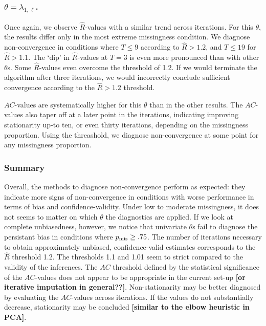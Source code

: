 \documentclass[Royal,times,sageh]{sagej}
\begin{document}
\hypertarget{thetalambda_1-ell.}{%
\subsubsection{\texorpdfstring{\(\theta=\lambda_{1, \ell}\).}{\textbackslash theta=\textbackslash lambda\_\{1, \textbackslash ell\}.}}\label{thetalambda_1-ell.}}

Once again, we observe \(\widehat{R}\)-values with a similar trend across iterations. For this \(\theta\), the results differ only in the most extreme missingness condition. We diagnose non-convergence in conditions where \(T\leq9\) according to \(\widehat{R}>1.2\), and \(T\leq19\) for \(\widehat{R}>1.1\). The `dip' in \(\widehat{R}\)-values at \(T=3\) is even more pronounced than with other \(\theta\)s. Some \(\widehat{R}\)-values even overcome the threshold of 1.2. If we would terminate the algorithm after three iterations, we would incorrectly conclude sufficient convergence according to the \(\widehat{R}>1.2\) threshold.

\(AC\)-values are systematically higher for this \(\theta\) than in the other results. The \(AC\)-values also taper off at a later point in the iterations, indicating improving stationarity up-to ten, or even thirty iterations, depending on the missingness proportion. Using the threashold, we diagnose non-convergence at some point for any missingness proportion.

\hypertarget{summary-1}{%
\subsubsection{Summary}\label{summary-1}}

Overall, the methods to diagnose non-convergence perform as expected: they indicate more signs of non-convergence in conditions with worse performance in terms of bias and confidence-validity. Under low to moderate missingness, it does not seems to matter on which \(\theta\) the diagnostics are applied. If we look at complete unbiasedness, however, we notice that univariate \(\theta\)s fail to diagnose the persistant bias in conditions where \(p_{\rm mis}\geq.75\). The number of iterations necessary to obtain approximately unbiased, confidence-valid estimates corresponds to the \(\widehat{R}\) threshold 1.2. The thresholds 1.1 and 1.01 seem to strict compared to the validity of the inferences. The \(AC\) threshold defined by the statistical significance of the \(AC\)-values does not appear to be appropriate in the current set-up \textbf{{[}or iterative imputation in general??{]}}. Non-stationarity may be better diagnosed by evaluating the \(AC\)-values across iterations. If the values do not substantially decrease, stationarity may be concluded \textbf{{[}similar to the elbow heuristic in PCA{]}}.
\end{document}
